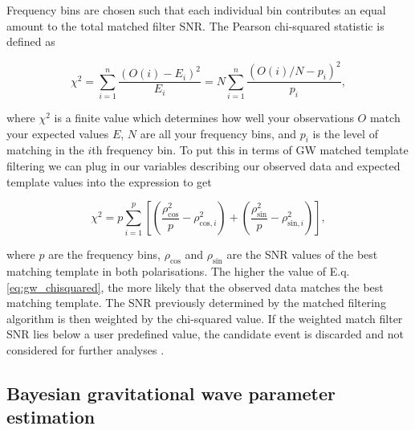 Frequency bins are chosen such that each individual bin contributes an equal amount to the total matched filter \ac{SNR}. The Pearson chi-squared statistic is defined as 

\begin{equation}
    \chi^2 = \sum_{i=1}^{n} \frac{(O(i) - E_i)^2}{E_i} 
    = N \sum_{i=1}^{n} \frac{(O(i)/N - p_i)^2}{p_i},
\end{equation}

%
%
where $\chi^2$ is a finite value which determines how well your observations $O$ match your expected values $E$, $N$ are all your frequency bins, and $p_i$ is the level of matching in the $i$th frequency bin. To put this in terms of \ac{GW} matched template filtering we can plug in our variables describing our observed data and expected template values into the expression to get 

\begin{equation} \label{eq:gw_chisquared}
    \chi^2 = p \sum_{i=1}^p \left[  \left( \frac{\rho_{\mathrm{cos}}^2 }{p} - \rho_{\mathrm{cos}, i}^2 \right) 
    + \left( \frac{\rho_{\mathrm{sin}}^2 }{p} - \rho_{\mathrm{sin}, i}^2 \right) \right],
\end{equation}

where $p$ are the frequency bins, $\rho_{\mathrm{cos}}$ and $\rho_{\mathrm{sin}}$ are the \ac{SNR} values of the best matching template in both polarisations. The higher the value of E.q. \ref{eq:gw_chisquared}, the more likely that the observed data matches the best matching template. The \ac{SNR} previously determined by the matched filtering algorithm is then weighted by the chi-squared value. If the weighted match filter \ac{SNR} lies below a user predefined value, the candidate event is discarded and not considered for further analyses \cite{0264-9381-33-21-215004}.

\subsection{Bayesian gravitational wave parameter estimation}

%
%

